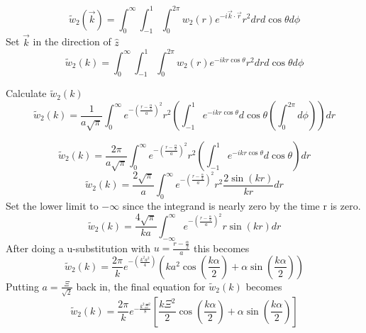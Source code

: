 \documentclass[double,12pt]{beavtex}
\begin{document}
\begin{equation}{\widetilde{w}_2(\vec{k})=\int_{0}^{\infty}\int_{-1}^{1}\int_{0}^{2\pi}w_2(r)e^{-i\vec{k}\cdot{\vec{r}}}r^2d{r}d{\cos\theta}d{\phi}}\end{equation}
Set $\vec{k}$ in the direction of $\hat{z}$ 
\begin{equation}{\widetilde{w}_2(k)=\int_{0}^{\infty}\int_{-1}^{1}\int_{0}^{2\pi}w_2(r)e^{-ikr\cos\theta}r^2d{r}d{\cos\theta}d{\phi}}\end{equation}

\noindent Calculate $\widetilde{w}_2(k)$ 
\begin{equation}{\widetilde{w}_2(k)=\frac{1}{a\sqrt{\pi}}\int_{0}^{\infty}e^{-\left(\frac{r-\frac{\alpha}{2}}{a}\right)^2}r^2\left(\int_{-1}^{1}e^{-ikr\cos\theta}d{\cos\theta}\left(\int_{0}^{2\pi}d{\phi}\right)\right)d{r}}\end{equation}

\begin{equation}{\widetilde{w}_2(k)=\frac{2\pi}{a\sqrt{\pi}}\int_{0}^{\infty}e^{-\left(\frac{r-\frac{\alpha}{2}}{a}\right)^2}r^2\left(\int_{-1}^{1}e^{-ikr\cos\theta}d{\cos\theta}\right)d{r}}\end{equation}
\begin{equation}{\widetilde{w}_2(k)=\frac{2\sqrt{\pi}}{a}\int_{0}^{\infty}e^{-\left(\frac{r-\frac{\alpha}{2}}{a}\right)^2}r^2\frac{2\sin(kr)}{kr}d{r}}\end{equation}
Set the lower limit to $-\infty$  since the integrand is nearly zero by the time r is zero.
\begin{equation}{\widetilde{w}_2(k)=\frac{4\sqrt{\pi}}{ka}\int_{-\infty}^{\infty}e^{-\left(\frac{r-\frac{\alpha}{2}}{a}\right)^2}r\sin(kr)d{r}}\end{equation}
After doing a u-substitution with $u=\frac{r-\frac{\alpha}{2}}{a}$ this becomes
\begin{equation}{\widetilde{w}_2(k)=\frac{2\pi}{k}e^{-\left(\frac{k^2a^2}{4}\right)}\left(ka^2\cos\left(\frac{k\alpha}{2}\right)+\alpha\sin\left(\frac{k\alpha}{2}\right)\right)}\end{equation}
Putting $a=\frac{\Xi}{\sqrt{2}}$ back in, the final equation for $\widetilde{w}_2(k)$ becomes
\begin{equation}{\widetilde{w}_2(k)=\frac{2\pi}{k}e^{-\frac{k^2\Xi^2}{8}}\left[\frac{k\Xi^2}{2}\cos\left(\frac{k\alpha}{2}\right)+\alpha\sin\left(\frac{k\alpha}{2}\right)\right]}\end{equation}
\end{document}

